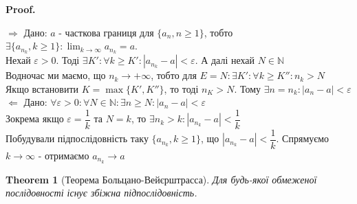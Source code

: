 \documentclass[a4paper, 14pt]{article}
\makeatletter
\def\qed{$\blacksquare$}
\def\rightproof{$\boxed{\Rightarrow}$ }
\def\leftproof{$\boxed{\Leftarrow}$ }
\theoremstyle{theoremdd}
\newtheorem{theorem}{Theorem}[subsection]
\theoremstyle{theoremdd}
\theoremstyle{theoremdd}
\theoremstyle{theoremdd}
\theoremstyle{theoremdd}
\theoremstyle{theoremdd}
\theoremstyle{theoremdd}
\theoremstyle{theoremdd}
\renewenvironment{proof}[1][Proof.\\]{\par
\pushQED{\hfill \qed}%
\normalfont \topsep6\p@\@plus6\p@\relax
\trivlist
\item\relax
{\bfseries
#1\@addpunct{.}}\hspace\labelsep\ignorespaces
}{%
\popQED\endtrivlist\@endpefalse
}
\makeatother
\begin{document}
	\begin{proof}
	\rightproof Дано: $a$ - часткова границя для $\{a_n, n \geq 1\}$, тобто $\exists \{a_{n_k}, k \geq 1\}: \displaystyle \lim_{k \to \infty} a_{n_k} = a$.\\
	Нехай $\varepsilon > 0$. Тоді $\exists K': \forall k \geq K': |a_{n_k} - a| < \varepsilon$. А далі нехай $N \in \mathbb{N}$\\
	Водночас ми маємо, що $n_k \to +\infty$, тобто для $E = N: \exists K': \forall k \geq K'': n_k > N$\\
	Якщо встановити $K = \max\{K', K''\}$, то тоді $n_K > N$. Тому $\exists n = n_k: |a_n-a|<\varepsilon$
	\bigskip \\
	
	\leftproof Дано: $\forall \varepsilon > 0: \forall N \in \mathbb{N}: \exists n \geq N: |a_n-a| < \varepsilon$\\
	Зокрема якщо $\varepsilon = \dfrac{1}{k}$ та $N = k$, то $\exists n_k > k: |a_{n_k}-a| < \dfrac{1}{k}$\\
	Побудували підпослідовність таку $\{a_{n_k}, k \geq 1\}$, що $|a_{n_k} - a| < \dfrac{1}{k}$. Спрямуємо $k \to \infty$ - отримаємо $a_{n_k} \to a$
	\end{proof}
	
	\begin{theorem}[Теорема Больцано-Вейєрштрасса]
	Для будь-якої обмеженої послідовності існує збіжна підпослідовність.
	\end{theorem}
	
\end{document}
